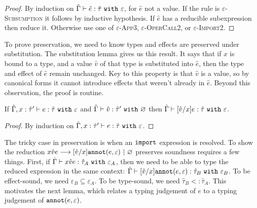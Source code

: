 \begin{proof} By induction on $\hat \Gamma \vdash \hat e: \hat \tau~\mathtt{with}~ \varepsilon$, for $\hat e$ not a value. If the rule is \textsc{$\varepsilon$-Subsumption} it follows by inductive hypothesis. If $\hat e$ has a reducible subexpression then reduce it. Otherwise use one of \textsc{$\varepsilon$-App3}, \textsc{$\varepsilon$-OperCall2}, or \textsc{$\varepsilon$-Import2}.
\end{proof}

\noindent
To prove preservation, we need to know types and effects are preserved under substitution. The substitution lemma gives us this result. It says that if $x$ is bound to a type, and a value $\hat v$ of that type is substituted into $\hat e$, then the type and effect of $\hat e$ remain unchanged. Key to this property is that $\hat v$ is a value, so by canonical forms it cannot introduce effects that weren't already in $\hat e$. Beyond this observation, the proof is routine.

\begin{lemma}[Substitution]
If $\hat \Gamma, x: \hat \tau' \vdash e: \hat \tau~\mathtt{with}~ \varepsilon$ and $\hat \Gamma \vdash \hat v: \hat \tau'~\mathtt{with}~ \varnothing$ then $\hat \Gamma \vdash [\hat v/x]e: \hat \tau~\mathtt{with}~ \varepsilon$.
\end{lemma}

\begin{proof} By induction on $\hat \Gamma, x: \hat \tau' \vdash e: \hat \tau~\mathtt{with}~ \varepsilon$.
\end{proof}

\noindent
The tricky case in preservation is when an $\mathtt{import}$ expression is resolved. To show the reduction ${x}{\hat v}{e} \longrightarrow [\hat v/x]\mathtt{annot}(e, \varepsilon)~|~\varnothing$ preserves soundness requires a few things. First, if $\hat \Gamma \vdash {x}{\hat v}{e}: \hat \tau_A~\mathtt{with}~ \varepsilon_A$, then we need to be able to type the reduced expression in the same context: $\hat \Gamma \vdash [\hat v/x]\mathtt{annot}(e, \varepsilon): \hat \tau_B~\mathtt{with}~ \varepsilon_B$. To be effect-sound, we need $\varepsilon_B \subseteq \varepsilon_A$. To be type-sound, we need $\hat \tau_B <: \hat \tau_A$. This motivates the next lemma, which relates a typing judgement of $e$ to a typing judgement of $\mathtt{annot}(e, \varepsilon)$.

